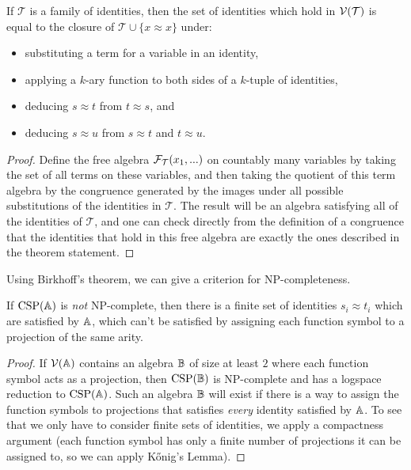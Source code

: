 \documentclass[letterpaper,11pt]{article}
\DeclareMathOperator{\CSP}{CSP}
\begin{document}
\begin{thm} If $\mathcal{T}$ is a family of identities, then the set of identities which hold in $\mathcal{V}(\mathcal{T})$ is equal to the closure of $\mathcal{T} \cup \{x \approx x\}$ under:
\begin{itemize}
\item substituting a term for a variable in an identity,
\item applying a $k$-ary function to both sides of a $k$-tuple of identities,
\item deducing $s\approx t$ from $t \approx s$, and
\item deducing $s \approx u$ from $s \approx t$ and $t \approx u$.
\end{itemize}
\end{thm}
\begin{proof} Define the free algebra $\mathcal{F}_{\mathcal{T}}(x_1, ...)$ on countably many variables by taking the set of all terms on these variables, and then taking the quotient of this term algebra by the congruence generated by the images under all possible substitutions of the identities in $\mathcal{T}$. The result will be an algebra satisfying all of the identities of $\mathcal{T}$, and one can check directly from the definition of a congruence that the identities that hold in this free algebra are exactly the ones described in the theorem statement.
\end{proof}

Using Birkhoff's theorem, we can give a criterion for NP-completeness.

\begin{thm} If $\CSP(\bA)$ is \emph{not} NP-complete, then there is a finite set of identities $s_i \approx t_i$ which are satisfied by $\mathbb{A}$, which can't be satisfied by assigning each function symbol to a projection of the same arity.
\end{thm}
\begin{proof} If $\mathcal{V}(\mathbb{A})$ contains an algebra $\mathbb{B}$ of size at least $2$ where each function symbol acts as a projection, then $\CSP(\bB)$ is NP-complete and has a logspace reduction to $\CSP(\bA)$. Such an algebra $\mathbb{B}$ will exist if there is a way to assign the function symbols to projections that satisfies \emph{every} identity satisfied by $\mathbb{A}$. To see that we only have to consider finite sets of identities, we apply a compactness argument (each function symbol has only a finite number of projections it can be assigned to, so we can apply K\H{o}nig's Lemma).
\end{proof}
\end{document}
